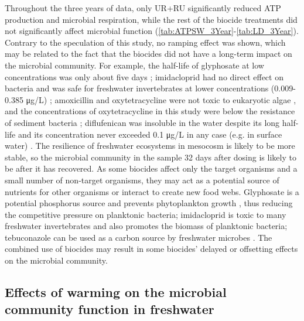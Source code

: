 \documentclass[11pt, a4paper]{article}
\newcommand{\multiref}[2]{\autoref{#1}-\ref{#2}} %
\begin{document}
\begin{spacing}{1.5}
Throughout the three years of data, only UR+RU significantly reduced ATP production and microbial respiration, while the rest of the biocide treatments did not significantly affect microbial function (\multiref{tab:ATPSW_3Year}{tab:LD_3Year}). Contrary to the speculation of this study, no ramping effect was shown, which may be related to the fact that the biocides did not have a long-term impact on the microbial community. For example, the half-life of glyphosate at low concentrations was only about five days \citep{perez2007effects}; imidacloprid had no direct effect on bacteria and was safe for freshwater invertebrates at lower concentrations (0.009-0.385 μg/L) \citep{barbosa2021resistance}; amoxicillin and oxytetracycline were not toxic to eukaryotic algae \citep{andreozzi2004antibiotics}, and the concentrations of oxytetracycline in this study were below the resistance of sediment bacteria \citep{samuelsen1992long}; diflufenican was insoluble in the water despite its long half-life and its concentration never exceeded 0.1 μg/L in any case (e.g. in surface water) \citep{CARABIASMARTINEZ2000471}. The resilience of freshwater ecosystems in mesocosm is likely to be more stable, so the microbial community in the sample 32 days after dosing is likely to be after it has recovered. As some biocides affect only the target organisms and a small number of non-target organisms, they may act as a potential source of nutrients for other organisms or interact to create new food webs. Glyphosate is a potential phosphorus source and prevents phytoplankton growth \citep{barbosa2021resistance}, thus reducing the competitive pressure on planktonic bacteria; imidacloprid is toxic to many freshwater invertebrates and also promotes the biomass of planktonic bacteria; tebuconazole can be used as a carbon source by freshwater microbes \citep{pascault2014high}. The combined use of biocides may result in some biocides' delayed or offsetting effects on the microbial community.

\subsection{Effects of warming on the microbial community function in freshwater}


\end{spacing}
\end{document}
